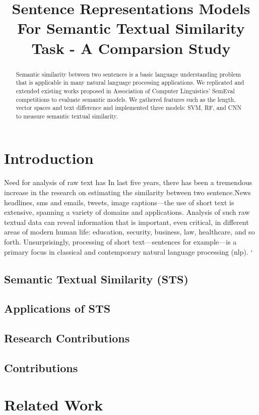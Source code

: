\documentclass{article} %
\title{Sentence Representations Models For Semantic Textual Similarity Task - A Comparsion Study}
\begin{document}
\maketitle


\begin{abstract}
Semantic similarity between two sentences is a basic language understanding problem that is applicable in many natural language processing applications. We replicated and extended existing works proposed in Association of Computer Linguistics' SemEval competitions to evaluate semantic models. We gathered features such as the length, vector spaces and text difference and implemented three models: SVM, RF, and CNN to measure semantic textual similarity. 
\end{abstract}

\section{Introduction}
Need for analysis of raw text has 
In last five years, there has been a tremendous increase in the research on estimating the similarity between two sentence.News headlines, sms and emails, tweets, image captions—the use of short text is
extensive, spanning a variety of domains and applications. Analysis of such raw textual data
can reveal information that is important, even critical, in different areas of modern human
life: education, security, business, law, healthcare, and so forth. Unsurprisingly, processing of
short text—sentences for example—is a primary focus in classical and contemporary natural
language processing (nlp).	`																		

\subsection{Semantic Textual Similarity (STS)}
\subsection{Applications of STS}
\subsection{Research Contributions}
\subsection{Contributions}
\section{Related Work}
\end{document}
